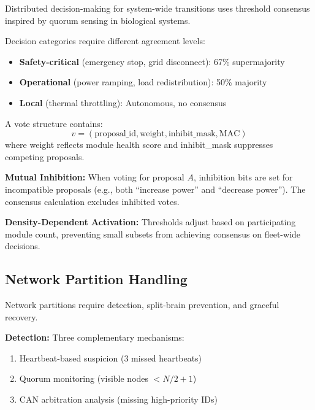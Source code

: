 Distributed decision-making for system-wide transitions uses threshold consensus inspired by quorum sensing in biological systems.

\begin{definition}
Decision categories require different agreement levels:
\begin{itemize}
    \item \textbf{Safety-critical} (emergency stop, grid disconnect): 67\% supermajority
    \item \textbf{Operational} (power ramping, load redistribution): 50\% majority
    \item \textbf{Local} (thermal throttling): Autonomous, no consensus
\end{itemize}
\end{definition}

\begin{definition}
A vote structure contains:
\begin{equation}
v = (\text{proposal\_id}, \text{weight}, \text{inhibit\_mask}, \text{MAC})
\end{equation}
where weight reflects module health score and inhibit\_mask suppresses competing proposals.
\end{definition}

\textbf{Mutual Inhibition:} When voting for proposal $A$, inhibition bits are set for incompatible proposals (e.g., both ``increase power'' and ``decrease power''). The consensus calculation excludes inhibited votes.

\textbf{Density-Dependent Activation:} Thresholds adjust based on participating module count, preventing small subsets from achieving consensus on fleet-wide decisions.

\subsection{Network Partition Handling}

Network partitions require detection, split-brain prevention, and graceful recovery.

\textbf{Detection:} Three complementary mechanisms:
\begin{enumerate}
    \item Heartbeat-based suspicion (3 missed heartbeats)
    \item Quorum monitoring (visible nodes $< N/2 + 1$)
    \item CAN arbitration analysis (missing high-priority IDs)
\end{enumerate}

